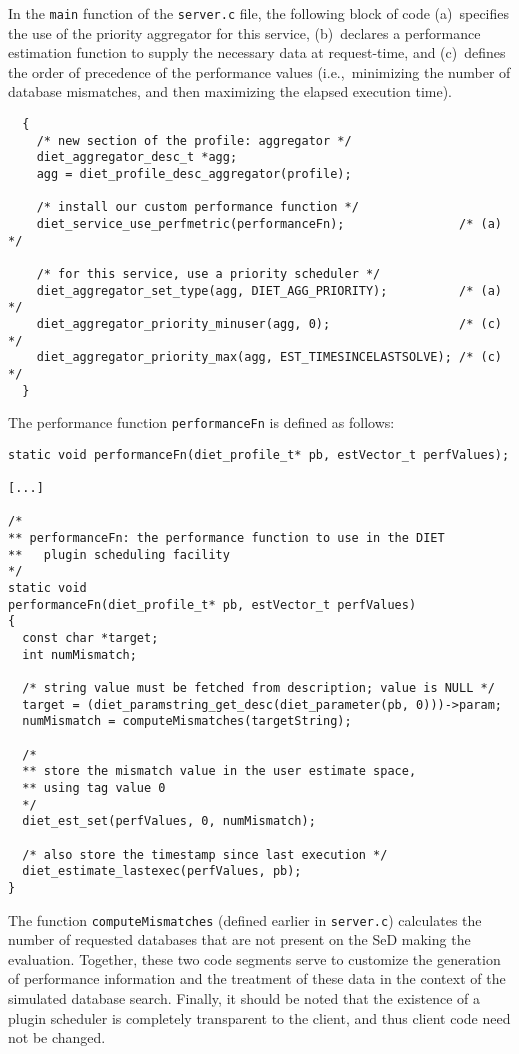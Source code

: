 In the \texttt{main} function of the \texttt{server.c} file, the
following block of code (a)~specifies the use of the priority
aggregator for this service, (b)~declares a performance estimation
function to supply the necessary data at request-time, and
(c)~defines the order of precedence of the performance values
(i.e.,~minimizing the number of database mismatches, and then
maximizing the elapsed execution time).
\begin{verbatim}
  {
    /* new section of the profile: aggregator */
    diet_aggregator_desc_t *agg;
    agg = diet_profile_desc_aggregator(profile);

    /* install our custom performance function */
    diet_service_use_perfmetric(performanceFn);                /* (a) */

    /* for this service, use a priority scheduler */
    diet_aggregator_set_type(agg, DIET_AGG_PRIORITY);          /* (a) */
    diet_aggregator_priority_minuser(agg, 0);                  /* (c) */
    diet_aggregator_priority_max(agg, EST_TIMESINCELASTSOLVE); /* (c) */
  }
\end{verbatim}
The performance function \texttt{performanceFn} is defined as follows:
\begin{verbatim}
static void performanceFn(diet_profile_t* pb, estVector_t perfValues);

[...]

/*
** performanceFn: the performance function to use in the DIET
**   plugin scheduling facility
*/
static void
performanceFn(diet_profile_t* pb, estVector_t perfValues)
{
  const char *target;
  int numMismatch;

  /* string value must be fetched from description; value is NULL */
  target = (diet_paramstring_get_desc(diet_parameter(pb, 0)))->param;
  numMismatch = computeMismatches(targetString);

  /*
  ** store the mismatch value in the user estimate space,
  ** using tag value 0
  */
  diet_est_set(perfValues, 0, numMismatch);

  /* also store the timestamp since last execution */
  diet_estimate_lastexec(perfValues, pb);
}
\end{verbatim}
The function \texttt{computeMismatches} (defined earlier in
\texttt{server.c}) calculates the number of requested databases that
are not present on the SeD making the evaluation.
Together, these two code segments serve to customize the generation of
performance information and the treatment of these data in the context
of the simulated database search.
Finally, it should be noted that the existence of a plugin scheduler
is completely transparent to the client, and thus client code need not
be changed.

